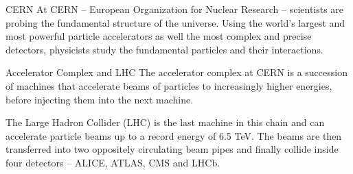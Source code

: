 
\begin{frame}
	\begin{block}{CERN}
		At CERN -- European Organization for Nuclear Research -- scientists are probing the fundamental structure of the universe. Using the world's largest and most powerful particle accelerators as well the most complex and precise detectors, physicists study the fundamental particles and their interactions.
	\end{block}
	\begin{block}{Accelerator Complex and LHC}
		The accelerator complex at CERN is a succession of machines that accelerate beams of particles to increasingly higher energies, before injecting them into the next machine.
		
		The Large Hadron Collider (LHC) is the last machine in this chain and can accelerate particle beams up to a record energy of 6.5 TeV. The beams are then transferred into two oppositely circulating beam pipes and finally collide inside four detectors -- ALICE, ATLAS, CMS and LHCb.
	\end{block}
\end{frame}



